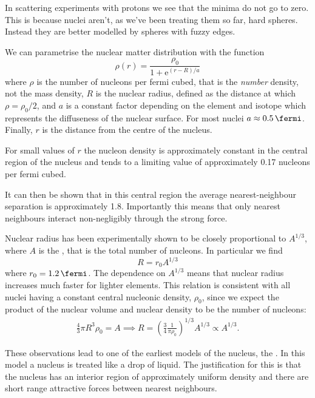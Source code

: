 \documentclass[fleqn]{NotesClass}
\newcommand{\e}{\mathrm{e}}
\begin{document}
    In scattering experiments with protons we see that the minima do not go to zero.
    This is because nuclei aren't, as we've been treating them so far, hard spheres.
    Instead they are better modelled by spheres with fuzzy edges.
    
    We can parametrise the nuclear matter distribution with the function
    \begin{equation}
        \rho(r) = \frac{\rho_0}{1 + \e^{(r - R)/a}}
    \end{equation}
    where \(\rho\) is the number of nucleons per fermi cubed, that is the \emph{number} density, not the mass density, \(R\) is the nuclear radius, defined as the distance at which \(\rho = \rho_0/2\), and \(a\) is a constant factor depending on the element and isotope which represents the diffuseness of the nuclear surface.
    For most nuclei \(a \approx \qty{0.5}{\fermi}\).
    Finally, \(r\) is the distance from the centre of the nucleus.
    
    For small values of \(r\) the nucleon density is approximately constant in the central region of the nucleus and tends to a limiting value of approximately \num{0.17} nucleons per fermi cubed.
    
    It can then be shown that in this central region the average nearest-neighbour separation is approximately \qty{1.8}{\fermi}.
    Importantly this means that only nearest neighbours interact non-negligibly through the strong force.
    
    Nuclear radius has been experimentally shown to be closely proportional to \(A^{1/3}\), where \(A\) is the , that is the total number of nucleons.
    In particular we find
    \begin{equation}
        R = r_0 A^{1/3}
    \end{equation}
    where \(r_0 = \qty{1.2}{\fermi}\).
    The dependence on \(A^{1/3}\) means that nuclear radius increases much faster for lighter elements.
    This relation is consistent with all nuclei having a constant central nucleonic density, \(\rho_0\), since we expect the product of the nuclear volume and nuclear density to be the number of nucleons:
    \begin{align}
        \frac{4}{3}\pi R^{3} \rho_0 = A \implies R = (\frac{3}{4}\frac{1}{\pi \rho_0})^{1/3}A^{1/3} \propto A^{1/3}.
    \end{align}
    
    These observations lead to one of the earliest models of the nucleus, the .
    In this model a nucleus is treated like a drop of liquid.
    The justification for this is that the nucleus has an interior region of approximately uniform density and there are short range attractive forces between nearest neighbours.
    
\end{document}
